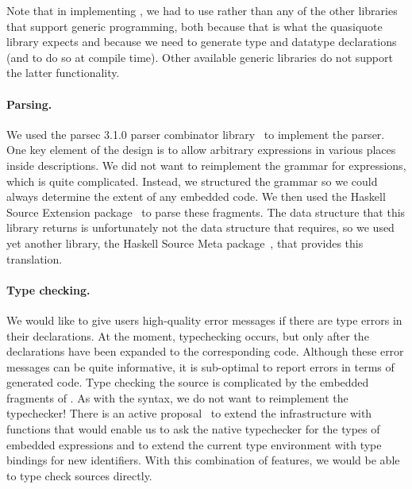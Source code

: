 Note that in implementing \forest{}, we had to use \template{}
rather than any of the other libraries that support generic programming,
both because that is what the quasiquote library expects and
because we need to generate type and datatype declarations (and to do
so at compile time).  
Other available generic libraries do not support the latter functionality.

\paragraph{Parsing.}  
We used the parsec 3.1.0 parser
combinator library~\cite{LeijenMeijer:parsec} to implement the \forest{} parser.  One key element
of the \forest{} design is to allow arbitrary \haskell{} expressions
in various places inside \forest{} descriptions.  We did not want to
reimplement the grammar for \haskell{} expressions, which is quite
complicated.  Instead, we structured the \forest{} grammar so we could
always determine the extent of any embedded \haskell{} code.  We then
used the Haskell Source Extension package~\cite{haskell-src-exts} to parse
these fragments.  The data structure that this library returns is
unfortunately not the data structure that \template{} requires, so we
used yet another library, the Haskell Source Meta
package~\cite{haskell-src-meta}, that provides this translation. 


\paragraph{Type checking.}
We would like to give users high-quality error messages if there
are type errors in their \forest{} declarations.  At the moment, 
typechecking occurs, but only after the \forest{} declarations have
been expanded to the corresponding \haskell{} code.  Although these
error messages can be quite informative, it is sub-optimal to report
errors in terms of generated code.  Type checking the \forest{} source
is complicated by the embedded fragments of \haskell{}.  As with the
syntax, we do not want to reimplement the \haskell{} typechecker!  
There is an active proposal~\cite{extend-templates} to extend the \template{} infrastructure
with functions that would enable us to ask the native \haskell{}
typechecker for the types of embedded expressions and to extend the
current type environment with type bindings for new identifiers.  With
this combination of features, we would be able to type check \forest{}
sources directly.

